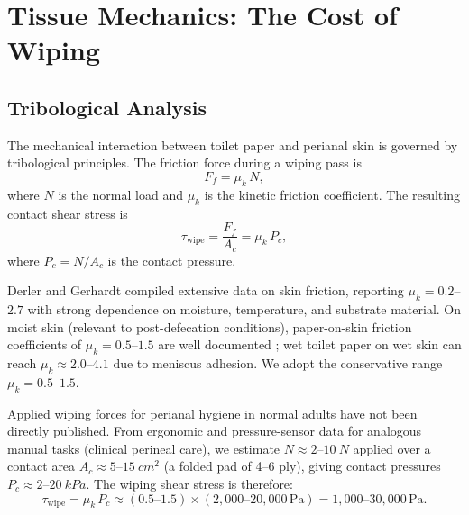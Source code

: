 \documentclass[aps,prfluids,reprint,amsmath,amssymb,floatfix]{revtex4-2}
\begin{document}
\section{Tissue Mechanics: The Cost of Wiping}
\label{sec:tribology}

\subsection{Tribological Analysis}
\label{subsec:tribology}

The mechanical interaction between toilet paper and perianal skin is governed
by tribological principles. The friction force during a wiping pass is
\begin{equation}
    F_f = \mu_k\,N,
    \label{eq:friction}
\end{equation}
where $N$ is the normal load and $\mu_k$ is the kinetic friction coefficient.
The resulting contact shear stress is
\begin{equation}
    \tau_\mathrm{wipe} = \frac{F_f}{A_c} = \mu_k\,P_c,
    \label{eq:contactshear}
\end{equation}
where $P_c = N/A_c$ is the contact pressure.

Derler and Gerhardt \citep{Derler2012} compiled extensive data on skin
friction, reporting $\mu_k = 0.2$--$2.7$ with strong dependence on
moisture, temperature, and substrate material. On moist skin (relevant to
post-defecation conditions), paper-on-skin friction coefficients of
$\mu_k = 0.5$--$1.5$ are well documented \citep{Vilhena2023}; wet toilet
paper on wet skin can reach $\mu_k \approx 2.0$--$4.1$ due to meniscus
adhesion. We adopt the conservative range $\mu_k = 0.5$--$1.5$.

Applied wiping forces for perianal hygiene in normal adults have not been
directly published. From ergonomic and pressure-sensor data for analogous
manual tasks (clinical perineal care), we estimate $N \approx 2$--$\SI{10}{N}$
applied over a contact area $A_c \approx 5$--$\SI{15}{cm^2}$ (a folded pad
of 4--6 ply), giving contact pressures $P_c \approx 2$--$\SI{20}{kPa}$.
The wiping shear stress is therefore:
\begin{equation}
    \tau_\mathrm{wipe} = \mu_k\,P_c \approx (0.5\text{--}1.5)
    \times (2{,}000\text{--}20{,}000\,\mathrm{Pa})
    = 1{,}000\text{--}30{,}000\,\mathrm{Pa}.
    \label{eq:wiperange}
\end{equation}
\end{document}

